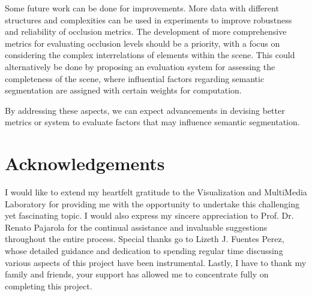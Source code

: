 \documentclass[11pt, a4paper,oneside,chapterprefix=false]{scrbook}
\begin{document}
Some future work can be done for improvements. More data with different structures and complexities can be used in experiments to improve robustness and reliability of occlusion metrics. The development of more comprehensive metrics for evaluating occlusion levels should be a priority, with a focus on considering the complex interrelations of elements within the scene. This could alternatively be done by proposing an evaluation system for assessing the completeness of the scene, where influential factors regarding semantic segmentation are assigned with certain weights for  computation.

By addressing these aspects, we can expect advancements in devising better metrics or system to evaluate factors that may influence semantic segmentation.



\chapter{Acknowledgements} \label{chp:acknowledgements}

I would like to extend my heartfelt gratitude to the Visualization and MultiMedia Laboratory for providing me with the opportunity to undertake this challenging yet fascinating topic. I would also express my sincere appreciation to Prof. Dr. Renato Pajarola for the continual assistance and invaluable suggestions throughout the entire process. Special thanks go to Lizeth J. Fuentes Perez, whose detailed guidance and dedication to spending regular time discussing various aspects of this project have been instrumental. Lastly, I have to thank my family and friends, your support has allowed me to concentrate fully on completing this project. 



\end{document}
